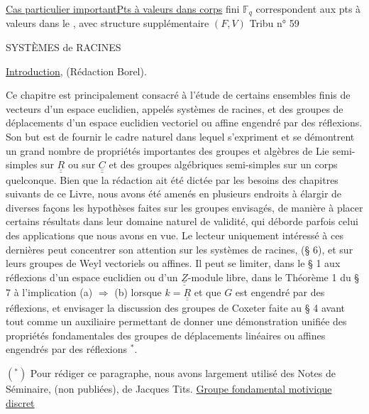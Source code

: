 \uline{Cas particulier important}\quad \uline{Pts à valeurs dans corps}
fini $\mathbb F_q$ correspondent aux pts à valeurs dans le
,
avec structure supplémentaire $(F,V)$
\hfill Tribu n° 59

SYSTÈMES de RACINES

\uline{Introduction}, (Rédaction Borel).

Ce chapitre est principalement consacré à l'étude de certains ensembles
finis de vecteurs d'un espace euclidien, appelés systèmes de racines, et des
groupes de déplacements d'un espace euclidien vectoriel ou affine engendré par
des réflexions. Son but est de fournir le cadre naturel dans lequel s'expriment
et se démontrent un grand nombre de propriétés importantes des groupes et algèbres
de Lie semi-simples sur $\underline{\underline{R}}$ ou sur $\underline{\underline{C}}$ et des groupes algébriques semi-simples
sur un corps quelconque. Bien que la rédaction ait été dictée par les besoins
des chapitres suivants de ce Livre, nous avons été amenés en plusieurs endroits
à élargir de diverses façons les hypothèses faites sur les groupes envisagés,
de manière à placer certains résultats dans leur domaine naturel de validité,
qui déborde parfois celui des applications que nous avons en vue. Le lecteur
uniquement intéressé à ces dernières peut concentrer son attention sur les
systèmes de racines, (§ 6), et sur leurs groupes de Weyl vectoriels ou affines.
Il peut se limiter, dans le § 1 aux réflexions d'un espace euclidien ou d'un
$\underline{\underline{Z}}$-module libre, dans le Théorème 1 du § 7 à l'implication (a) $\Longrightarrow$ (b) lorsque
$k=\underline{\underline{R}}$ et que $G$ est engendré par des réflexions, et envisager la discussion des
groupes de Coxeter faite au § 4 avant tout comme un auxiliaire permettant de
donner une démonstration unifiée des propriétés fondamentales des groupes de
déplacements linéaires ou affines engendrés par des réflexions $^{*}$.


$(^{*})$ Pour rédiger ce paragraphe, nous avons largement utilisé des Notes de
Séminaire, (non publiées), de Jacques Tits.
\uline{Groupe fondamental motivique discret}


